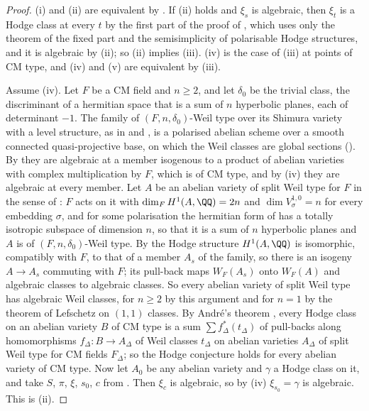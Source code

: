 \begin{proof}
(i) and (ii) are equivalent by . If (ii) holds and
$\xi_{s}$ is algebraic, then $\xi_{t}$ is a Hodge class at every $t$ by the
first part of the proof of , which uses only the theorem of
the fixed part and the semisimplicity of polarisable Hodge structures, and it
is algebraic by (ii); so (ii) implies (iii). (iv) is the case of (iii) at
points of CM type, and
(iv) and (v) are equivalent by (iii).

Assume (iv). Let $F$ be a CM field and $n\ge2$, and let $\delta_{0}$ be the
trivial class, the discriminant of a hermitian space that is a sum of $n$
hyperbolic planes, each of determinant $-1$. The family of
$(F,n,\delta_{0})$-Weil type over its Shimura variety with a level structure,
as in \cite[Setup~17.1]{paperI} and \cite[Setup~16.1]{paperI}, is a polarised abelian
scheme over a smooth connected quasi-projective base, on which the Weil
classes are global sections (\cite[Proposition~17.3(i)]{paperI}). By \cite[Theorem~1.1(i)]{paperI}
they are algebraic at a member isogenous to a product of abelian varieties
with complex multiplication by $F$, which is of CM type, and by (iv) they are
algebraic at every member. Let $A$ be an abelian variety of split Weil type
for $F$ in the sense of \cite[\S2.1]{Mil20}: $F$ acts on it with
$\dim_{F}H^{1}(A,\QQ)=2n$ and $\dim V_{\sigma}^{1,0}=n$ for every embedding
$\sigma$, and for some polarisation the hermitian form of
\cite[Remark~17.2]{paperI} has a totally isotropic subspace of dimension $n$, so
that it is a sum of $n$ hyperbolic planes and $A$ is of
$(F,n,\delta_{0})$-Weil type. By \cite[Proposition~17.3(iv)]{paperI} the Hodge structure
$H^{1}(A,\QQ)$ is isomorphic, compatibly with $F$, to that of a member $A_{s}$
of the family, so there is an isogeny $A\to A_{s}$ commuting with $F$; its
pull-back maps $W_{F}(A_{s})$ onto $W_{F}(A)$ and algebraic classes to
algebraic classes. So every abelian variety of split Weil type has algebraic
Weil classes, for $n\ge2$ by this argument and for $n=1$ by the theorem of
Lefschetz on $(1,1)$ classes. By Andr\'e's theorem
\cite[Theorem~1 and its proof]{Mil20}, every Hodge class on an abelian
variety $B$ of CM type is a sum $\sum f_{\Delta}^{*}(t_{\Delta})$ of
pull-backs along homomorphisms $f_{\Delta}\colon B\to A_{\Delta}$ of Weil
classes $t_{\Delta}$ on abelian varieties $A_{\Delta}$ of split Weil type
for CM fields $F_{\Delta}$; so the Hodge conjecture holds for every abelian
variety of CM type. Now let $A_{0}$ be any abelian variety and $\gamma$ a
Hodge class on it, and take $S$, $\pi$, $\xi$, $s_{0}$, $c$ from
. Then $\xi_{c}$ is algebraic, so by (iv)
$\xi_{s_{0}}=\gamma$ is algebraic. This is (ii).
\end{proof}

